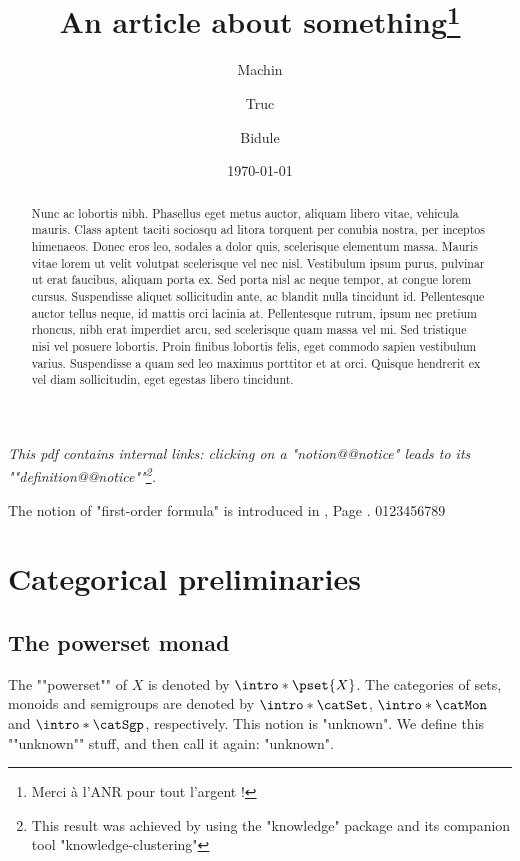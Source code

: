 \documentclass{fancy-article}
\title{An article about something\thanks{Merci à l'ANR pour tout l'argent !}}
\author[1]{Machin}
\author[2]{Truc}
\author[1]{Bidule}
\affil[1]{Institut du Fromage}
\affil[2]{Baguette Université Sorbonne-Est}
\date{\today}
\begin{document}
\maketitle

\begin{abstract}
  Nunc ac lobortis nibh. Phasellus eget metus auctor, aliquam libero vitae, vehicula mauris. Class aptent taciti sociosqu ad litora torquent per conubia nostra, per inceptos himenaeos. Donec eros leo, sodales a dolor quis, scelerisque elementum massa. Mauris vitae lorem ut velit volutpat scelerisque vel nec nisl. Vestibulum ipsum purus, pulvinar ut erat faucibus, aliquam porta ex. Sed porta nisl ac neque tempor, at congue lorem cursus. Suspendisse aliquet sollicitudin ante, ac blandit nulla tincidunt id. Pellentesque auctor tellus neque, id mattis orci lacinia at. Pellentesque rutrum, ipsum nec pretium rhoncus, nibh erat imperdiet arcu, sed scelerisque quam massa vel mi. Sed tristique nisi vel posuere lobortis. Proin finibus lobortis felis, eget commodo sapien vestibulum varius. Suspendisse a quam sed leo maximus porttitor et at orci. Quisque hendrerit ex vel diam sollicitudin, eget egestas libero tincidunt. 
\end{abstract}

\AP\emph{%
This pdf contains internal links: clicking on a "notion@@notice" leads to its
""definition@@notice""\footnote{This result was achieved by using the "knowledge" package
and its companion tool "knowledge-clustering"}.
}

The notion of "first-order formula" is introduced in
, Page .
0123456789

\section{Categorical preliminaries}
 
\subsection{The powerset monad}

\AP The ""powerset"" of $X$ is denoted by $\intro*\pset{X}$. The categories
of sets, monoids and semigroups are denoted by $\intro*\catSet$,
$\intro*\catMon$ and $\intro*\catSgp$, respectively.
This notion is "unknown". We define this ""unknown"" stuff, and then call it again: "unknown".
\end{document}
